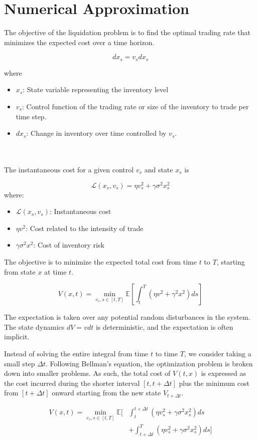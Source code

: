 \section*{Numerical Approximation}
The objective of the liquidation problem is to find the optimal trading rate that minimizes the expected cost over a time horizon.

$$dx_s = v_sdx_s$$

where
\begin{itemize}
\item $x_s$: State variable representing the inventory level
\item $v_s$: Control function of the trading rate or size of the inventory to trade per time step.
\item $dx_s$: Change in inventory over time controlled by $v_s$.
\end{itemize}
\\\\
The instantaneous cost for a given control $v_s$ and state $x_s$ is

$$\mathcal{L}(x_s,v_s) = \eta v_s^2 + \gamma \sigma^2x_s^2 $$
where:
\begin{itemize}
\item $\mathcal{L}(x_s,v_s)$: Instantaneous cost
\item $\eta v^2$: Cost related to the intensity of trade
\item $\gamma \sigma^2 x^2$: Cost of inventory risk
\end{itemize}

The objective is to minimize the expected total cost from time $t$ to $T$, starting from state $x$ at time $t$.

$$ V(x,t) = \min_{v_s, s \in[t,T]} \mathbb{E}\left[\int_t^T (\eta v^2 + \gamma^2x^2)ds \right]$$

The expectation is taken over any potential random disturbances in the system. The state dynamics $dV = vdt$ is deterministic, and the expectation is often implicit.

Instead of solving the entire integral from time $t$ to time $T$, we consider taking a small step $\Delta t$. Following Bellman's equation, the optimization problem is broken down into smaller problems. As such, the total cost of $V(t,x)$ is expressed as the cost incurred during the shorter interval $[t, t+\Delta t]$ plus the minimum cost from $[t+\Delta t]$ onward starting from the new state $V_{t+\Delta t}$.

\begin{equation*}
\begin{split}
V(x, t) = \min_{v_s, s \in [t, T]} \mathbb{E} \bigg[& \int_t^{t+\Delta t} (\eta v_s^2 + \gamma \sigma^2 x_s^2) ds \\
&+ \int_{t+\Delta t}^T (\eta v_s^2 + \gamma \sigma^2 x_s^2) ds\bigg]
\end{split}
\end{equation*}

